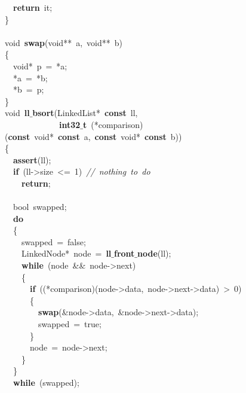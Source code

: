 \documentclass{article}
\begin{document}
\mbox{}\ \ \textbf{return}\ it; \\
\mbox{}\} \\
\mbox{} \\
\mbox{}void\ \textbf{swap}(void**\ a,\ void**\ b) \\
\mbox{}\{ \\
\mbox{}\ \ void*\ p\ =\ *a; \\
\mbox{}\ \ *a\ =\ *b; \\
\mbox{}\ \ *b\ =\ p; \\
\mbox{}\} \\
\mbox{}void\ \textbf{ll$\_$bsort}(LinkedList*\ \textbf{const}\ ll, \\
\mbox{}\ \ \ \ \ \ \ \ \ \ \ \ \ \textbf{int32$\_$t}\ (*comparison)(\textbf{const}\ void*\ \textbf{const}\ a,\ \textbf{const}\ void*\ \textbf{const}\ b)) \\
\mbox{}\{ \\
\mbox{}\ \ \textbf{assert}(ll); \\
\mbox{}\ \ \textbf{if}\ (ll-\textgreater{}size\ \textless{}=\ 1)\ \textit{//\ nothing\ to\ do} \\
\mbox{}\ \ \ \ \textbf{return}; \\
\mbox{} \\
\mbox{}\ \ bool\ swapped; \\
\mbox{}\ \ \textbf{do} \\
\mbox{}\ \ \{ \\
\mbox{}\ \ \ \ swapped\ =\ false; \\
\mbox{}\ \ \ \ LinkedNode*\ node\ =\ \textbf{ll$\_$front$\_$node}(ll); \\
\mbox{}\ \ \ \ \textbf{while}\ (node\ \&\&\ node-\textgreater{}next) \\
\mbox{}\ \ \ \ \{ \\
\mbox{}\ \ \ \ \ \ \textbf{if}\ ((*comparison)(node-\textgreater{}data,\ node-\textgreater{}next-\textgreater{}data)\ \textgreater{}\ 0) \\
\mbox{}\ \ \ \ \ \ \{ \\
\mbox{}\ \ \ \ \ \ \ \ \textbf{swap}(\&node-\textgreater{}data,\ \&node-\textgreater{}next-\textgreater{}data); \\
\mbox{}\ \ \ \ \ \ \ \ swapped\ =\ true; \\
\mbox{}\ \ \ \ \ \ \} \\
\mbox{}\ \ \ \ \ \ node\ =\ node-\textgreater{}next; \\
\mbox{}\ \ \ \ \} \\
\mbox{}\ \ \} \\
\mbox{}\ \ \textbf{while}\ (swapped); \\
\end{document}

